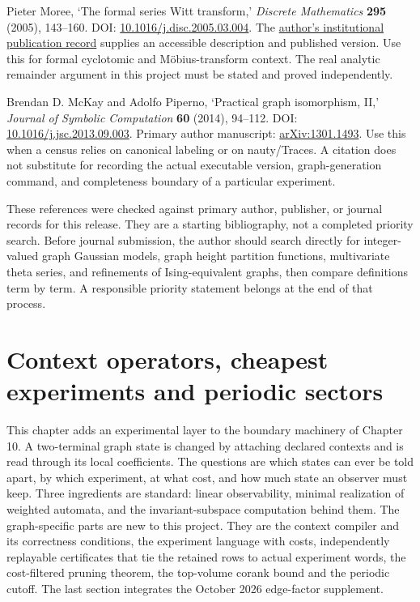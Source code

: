 \documentclass[
  11pt,
  a4paper,
]{report}
\begin{document}
Pieter Moree, `The formal series Witt transform,' \emph{Discrete
Mathematics} \textbf{295} (2005), 143--160. DOI:
\href{https://doi.org/10.1016/j.disc.2005.03.004}{10.1016/j.disc.2005.03.004}.
The
\href{https://dare.uva.nl/id/37cce5aa-6075-4ea8-be43-983fad2a99df}{author's
institutional publication record} supplies an accessible description and
published version. Use this for formal cyclotomic and Möbius-transform
context. The real analytic remainder argument in this project must be
stated and proved independently.

Brendan D. McKay and Adolfo Piperno, `Practical graph isomorphism, II,'
\emph{Journal of Symbolic Computation} \textbf{60} (2014), 94--112. DOI:
\href{https://doi.org/10.1016/j.jsc.2013.09.003}{10.1016/j.jsc.2013.09.003}.
Primary author manuscript:
\href{https://arxiv.org/abs/1301.1493}{arXiv:1301.1493}. Use this when a
census relies on canonical labeling or on nauty/Traces. A citation does
not substitute for recording the actual executable version,
graph-generation command, and completeness boundary of a particular
experiment.

These references were checked against primary author, publisher, or
journal records for this release. They are a starting bibliography, not
a completed priority search. Before journal submission, the author
should search directly for integer-valued graph Gaussian models, graph
height partition functions, multivariate theta series, and refinements
of Ising-equivalent graphs, then compare definitions term by term. A
responsible priority statement belongs at the end of that process.

\hypertarget{context-operators-cheapest-experiments-and-periodic-sectors}{%
\chapter{Context operators, cheapest experiments and periodic
sectors}\label{context-operators-cheapest-experiments-and-periodic-sectors}}

This chapter adds an experimental layer to the boundary machinery of
Chapter 10. A two-terminal graph state is changed by attaching declared
contexts and is read through its local coefficients. The questions are
which states can ever be told apart, by which experiment, at what cost,
and how much state an observer must keep. Three ingredients are
standard: linear observability, minimal realization of weighted
automata, and the invariant-subspace computation behind them. The
graph-specific parts are new to this project. They are the context
compiler and its correctness conditions, the experiment language with
costs, independently replayable certificates that tie the retained rows
to actual experiment words, the cost-filtered pruning theorem, the
top-volume corank bound and the periodic cutoff. The last section
integrates the October 2026 edge-factor supplement.
\end{document}
